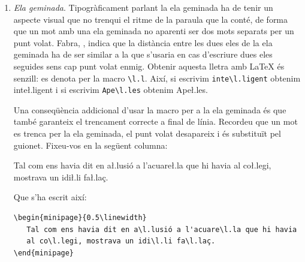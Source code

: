 \documentclass{tfgitic}[2024/07/01]
\begin{document}
\begin{enumerate}
  El guió mitjà denota la resta o el canvi de signe.  \LaTeX{} el fa
  servir automàticament quan cal en les expressions matemàtiques.  Per
  exemple, si escrivim \verb|$-3$| obtenim $-3$.  Noteu com escriure
  \verb|$-3$| i \verb|-3| dóna resultats diferents: $-3$ i -3
  respectivament. La forma correcta és la primera! Pel que fa a la
  resta, si escriviu \verb|$3-x$| s'obté $3-x$, que és el que toca.

  Els guions llargs marquen els incisos o les intervencions en un
  diàleg ---en els documents científics majoritàriament es fan servir
  pel primer cas. S'escriuen amb tres guions seguits. Per exemple, la
  frase anterior s'ha escrit així: \verb|diàleg ---en els documents|

\item \emph{Ela geminada}. Tipogràficament parlant la ela geminada ha
  de tenir un aspecte visual que no trenqui el ritme de la paraula que
  la conté, de forma que un mot amb una ela geminada no aparenti ser
  dos mots separats per un punt volat. Fabra, \cite{fabra84:_conver},
  indica que la distància entre les dues eles de la ela geminada ha de
  ser similar a la que s'usaria en cas d'escriure dues eles seguides
  sens cap punt volat enmig. Obtenir aquesta lletra amb \LaTeX{} és
  senzill: es denota per la macro \verb!\l.l!. Així, si escrivim
  \verb!inte\l.ligent! obtenim inte\l.ligent i si escrivim
  \verb!Ape\l.les! obtenim Ape\l.les.

  Una conseqüència addicional d'usar la macro per a la ela geminada és
  que també garanteix el trencament correcte a final de
  línia. Recordeu que un mot es trenca per la ela geminada, el punt
  volat desapareix i és substituït pel guionet. Fixeu-vos en la
  següent columna:

  \begin{center}
    \begin{minipage}{0.5\linewidth}
      Tal com ens havia dit en a\l.lusió a l'acuare\l.la que hi havia
      al co\l.legi, mostrava un idi\l.li fa\l.laç.
    \end{minipage}
  \end{center}

  Que s'ha escrit així:

\begin{verbatim}
\begin{minipage}{0.5\linewidth}
   Tal com ens havia dit en a\l.lusió a l'acuare\l.la que hi havia
   al co\l.legi, mostrava un idi\l.li fa\l.laç.
\end{minipage}
\end{verbatim}


\end{enumerate}
\end{document}
